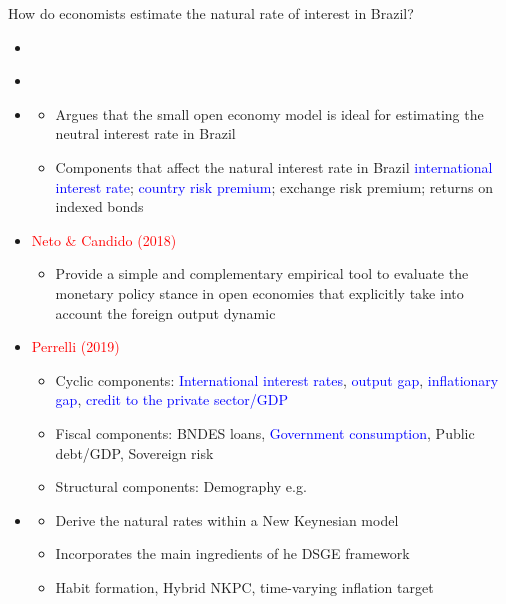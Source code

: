 \documentclass[9pt]{beamer}
\begin{document}
\begin{frame}{How do economists estimate the natural rate of interest in Brazil?}
\begin{itemize}

\item \textcolor{red}{\citet{Portugal:2009}}

\item \textcolor{red}{\citet{Moreira:2019}}

\item \textcolor{red}{\citet{Barbosa:2016}}    
\begin{itemize}
    \item Argues that the small open economy model is ideal for estimating the neutral interest rate in Brazil
    
    \item Components that affect the natural interest rate in Brazil
    \textcolor{blue}{international interest rate}; \textcolor{blue}{country risk premium}; exchange risk premium; returns on indexed bonds
\end{itemize}


\item \textcolor{red}{Neto & Candido (2018)}
\begin{itemize}
    \item Provide a simple and complementary empirical tool to evaluate the monetary policy stance in open economies that explicitly take into account the foreign output dynamic
\end{itemize}


\item \textcolor{red}{Perrelli (2019)}
\begin{itemize}
    \item Cyclic components: \textcolor{blue}{International interest rates}, \textcolor{blue}{output gap}, \textcolor{blue}{inflationary gap}, \textcolor{blue}{credit to the private sector/GDP}
    
    \item Fiscal components: BNDES loans, \textcolor{blue}{Government consumption}, Public debt/GDP, Sovereign risk
    
    \item Structural components: Demography e.g. \textcolor{red}{\citet{Ferrero:2016}}
\end{itemize}

\item \textcolor{red}{\citet{Palma:2017}}
\begin{itemize}
    \item Derive the natural rates within a New Keynesian model
    
    \item Incorporates the main ingredients of he DSGE framework
    
    \item Habit formation, Hybrid NKPC, time-varying inflation target
\end{itemize}


\end{itemize}
\end{frame}
\end{document}
